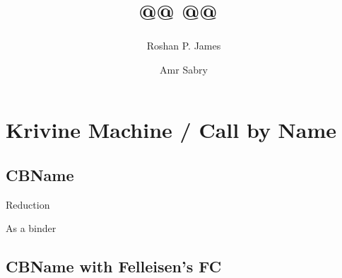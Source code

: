 \documentclass{article}
\begin{document}
\title{ {{@@ @@~ }} } 
\author{Roshan P. James \and Amr Sabry}
\maketitle

\begin{abstract}
\end{abstract}


\section{Krivine Machine / Call by Name} 

\subsection{CBName}




\begin{multicols}{2}
Reduction


\columnbreak
\noindent
As a binder

\end{multicols}



\subsection{CBName with Felleisen's {{FC}} }
\end{document}
